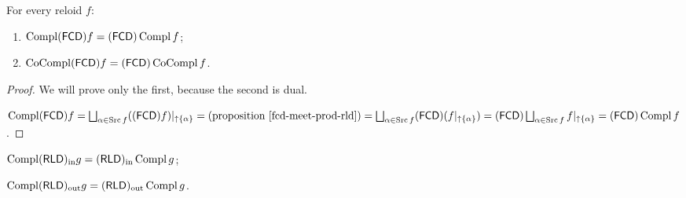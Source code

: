 \begin{thm}
  For every reloid $f$:
  \begin{enumerate}
    \item $\operatorname{Compl} (\mathsf{FCD}) f = (\mathsf{FCD})
    \operatorname{Compl} f$;
    \item $\operatorname{CoCompl} (\mathsf{FCD}) f = (\mathsf{FCD})
    \operatorname{CoCompl} f$.
  \end{enumerate}
\end{thm}

\begin{proof}
  We will prove only the first, because the second is dual.
  
  $\Compl (\mathsf{FCD}) f = \bigsqcup_{\alpha \in \Src f}
  ((\mathsf{FCD}) f) |_{\uparrow \{ \alpha \}} = \text{(proposition~\ref{fcd-meet-prod-rld})} =
  \bigsqcup_{\alpha \in \Src f} (\mathsf{FCD})
  (f|_{\uparrow \{ \alpha \}}) = (\mathsf{FCD}) \bigsqcup_{\alpha \in
  \Src f} f|_{\uparrow \{ \alpha \}} = (\mathsf{FCD})
  \Compl f$.
\end{proof}

\begin{conjecture}
\item $\operatorname{Compl}(\mathsf{RLD})_{\mathrm{in}} g=(\mathsf{RLD})_{\mathrm{in}}\operatorname{Compl} g$;
\item $\operatorname{Compl}(\mathsf{RLD})_{\mathrm{out}} g=(\mathsf{RLD})_{\mathrm{out}}\operatorname{Compl} g$.
\end{conjecture}


